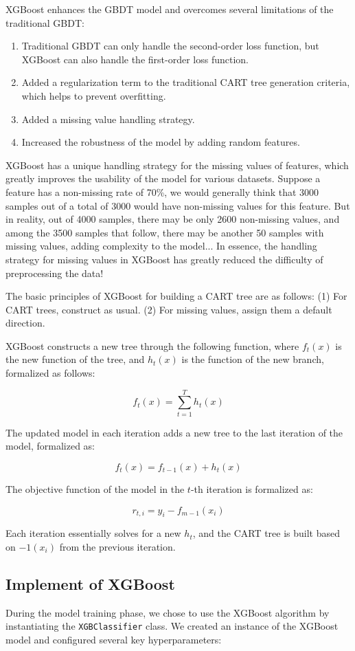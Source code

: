 \documentclass[12pt]{article}
\begin{document}
XGBoost enhances the GBDT model and overcomes several limitations of the traditional GBDT:
\begin{enumerate}
    \item Traditional GBDT can only handle the second-order loss function, but XGBoost can also handle the first-order loss function.
    \item Added a regularization term to the traditional CART tree generation criteria, which helps to prevent overfitting.
    \item Added a missing value handling strategy.
    \item Increased the robustness of the model by adding random features.
\end{enumerate}

XGBoost has a unique handling strategy for the missing values of features, which greatly improves the usability of the model for various datasets. Suppose a feature has a non-missing rate of 70\%, we would generally think that 3000 samples out of a total of 3000 would have non-missing values for this feature. But in reality, out of 4000 samples, there may be only 2600 non-missing values, and among the 3500 samples that follow, there may be another 50 samples with missing values, adding complexity to the model... In essence, the handling strategy for missing values in XGBoost has greatly reduced the difficulty of preprocessing the data!

The basic principles of XGBoost for building a CART tree are as follows: (1) For CART trees, construct as usual. (2) For missing values, assign them a default direction.

XGBoost constructs a new tree through the following function, where \( f_t(x) \) is the new function of the tree, and \( h_t(x) \) is the function of the new branch, formalized as follows:

\[
f_t(x) = \sum_{t=1}^{T} h_t(x)
\]

The updated model in each iteration adds a new tree to the last iteration of the model, formalized as:

\[
f_t(x) = f_{t-1}(x) + h_t(x)
\]

The objective function of the model in the \( t \)-th iteration is formalized as:

\[
r_{t,i} = y_i - f_{m-1}(x_i)
\]

Each iteration essentially solves for a new \( h_t \), and the CART tree is built based on \( -1(x_i) \) from the previous iteration.


\subsection*{Implement of XGBoost}
During the model training phase, we chose to use the XGBoost algorithm by instantiating the \texttt{XGBClassifier} class. We created an instance of the XGBoost model and configured several key hyperparameters:
\end{document}
